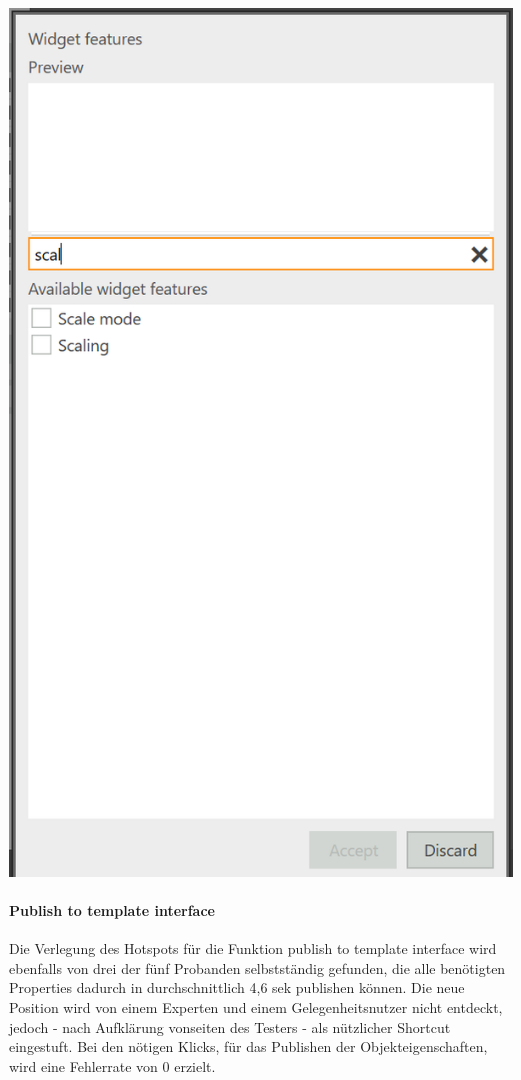 \begin{center}
  \includegraphics[scale= 0.6]{figures/Feature_Test.PNG}
  \label{fig:Feature_Test}
\end{center}

\paragraph{Publish to template interface}
Die Verlegung des Hotspots für die Funktion \glqq publish to template interface\grqq{} wird ebenfalls von drei der fünf Probanden selbstständig gefunden, die alle benötigten Properties dadurch in durchschnittlich 4,6 sek publishen können.
Die neue Position wird von einem Experten und einem Gelegenheitsnutzer nicht entdeckt, jedoch - nach Aufklärung vonseiten des Testers - als nützlicher Shortcut eingestuft.
Bei den nötigen Klicks, für das Publishen der Objekteigenschaften, wird eine Fehlerrate von 0 erzielt.


